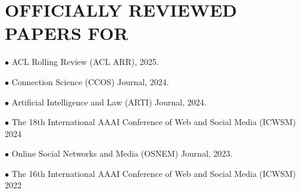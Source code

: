 \documentclass[paper=a4,fontsize=10pt]{scrartcl} %
\newcommand{\sepspace}{\vspace*{0.6em}}		%
\newcommand{\NewPart}[1]{\section*{\uppercase{#1}}}
\newcommand{\EducationEntry}[4]{
		\noindent \textbf{#1} \hfill      %
		\colorbox{Black}{%
			\parbox{6em}{%
			\hfill\color{White}#2}} \par  %
		\noindent \textit{#3} \par        %
		\noindent\hangindent=2em\hangafter=0 \small #4 %
		\normalsize \par}
\begin{document}
{%











}














\NewPart{Officially Reviewed Papers for}{}

{
\small
    \noindent $\bullet$ ACL Rolling Review (ACL ARR), 2025. \sepspace
    
    \noindent $\bullet$ Connection Science (CCOS) Journal, 2024. \sepspace
    
    \noindent $\bullet$ Artificial Intelligence and Law (ARTI) Journal, 2024. \sepspace

    \noindent $\bullet$ The 18th International AAAI Conference of Web and Social Media (ICWSM) 2024 \sepspace

    \noindent $\bullet$ Online Social Networks and Media (OSNEM) Journal, 2023. \sepspace
    
    \noindent $\bullet$ The 16th International AAAI Conference of Web and Social Media (ICWSM) 2022 \sepspace
}
\vspace*{-1mm}
\end{document}
